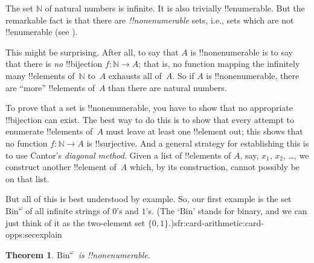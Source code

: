 \documentclass[10pt,a4paper]{article}
\makeatletter
\theoremstyle{plain}
\newtheorem{thm}{Theorem}[section]
\theoremstyle{definition}
\theoremstyle{remark}
\newenvironment{explain}{}{}
\newcommand*{\ollabel}[1]{\label{#1}}
\newcommand{\olref}{\@ifnextchar[{\olref@i}{\olref@final}}
\def\olref@i[#1]{\@ifnextchar[{\olref@ii}{\olref@final}}
\def\olref@ii[#1]{\@ifnextchar[{\olref@iii}{\olref@final}}
\def\olref@iii[#1]{\olref@final}
\def\olref@final#1{\ref{#1}}
\providecommand{\Nat}{\ensuremath{\mathbb{N}}}
\providecommand{\funfromto}[3]{#1\colon #2 \to #3}
\providecommand{\Bin}{\mathrm{Bin}}
\providecommand{\oliflabeldef}[3]{#1}
\makeatother
\begin{document}
\begin{explain}
The set $\Nat$ of natural numbers is infinite. It is also trivially
!!{enumerable}. But the remarkable fact is that there are
\emph{!!{nonenumerable}} sets, i.e., sets which are not !!{enumerable}
(see \olref[sfr][siz][enm-alt]{defn:enumerable}).

This might be surprising. After all, to say that $A$ is
!!{nonenumerable} is to say that there is \emph{no} !!{bijection} $f
\colon \Nat \to A$; that is, no function mapping the infinitely many
!!{element}s of~$\Nat$ to~$A$ exhausts all of~$A$.  So if $A$ is
!!{nonenumerable}, there are ``more'' !!{element}s of~$A$ than there
are natural numbers.

To prove that a set is !!{nonenumerable}, you have to show that no
appropriate !!{bijection} can exist. The best way to do this is to
show that every attempt to enumerate !!{element}s of~$A$ must leave at
least one !!{element} out; this shows that no function $f\colon \Nat
\to A$ is !!{surjective}. And a general strategy for establishing this
is to use Cantor's \emph{diagonal method}. Given a list of
!!{element}s of $A$, say, $x_1$, $x_2$, \dots, we construct another
!!{element} of~$A$ which, by its construction, cannot possibly be on
that list.

But all of this is best understood by example. So, our first example
is the set~$\Bin^\omega$ of all infinite strings of $0$'s and $1$'s.
(The `$\Bin$' stands for binary, and we can just think of it as the
two-element set
$\{0,1\}$.)\oliflabeldef{sfr:card-arithmetic:card-opps:sec}{\footnote{More
accurately, we should stipulate that $\Bin^\omega$ is the set of all
$\omega$-sequences of $0$'s and $1$s, i.e., the set
$\funfromto{\omega}{\{0,1\}}$. But the meaning of this will only
become clear in \olref[sfr][card-arithmetic][card-opps]{sec}.}{} This
slightly loose formulation should not cause any confusions
for now, however.}
\end{explain}

\begin{thm}
\ollabel{thm:nonenum-bin-omega}
$\Bin^\omega$~is !!{nonenumerable}.
\end{thm}
\end{document}
